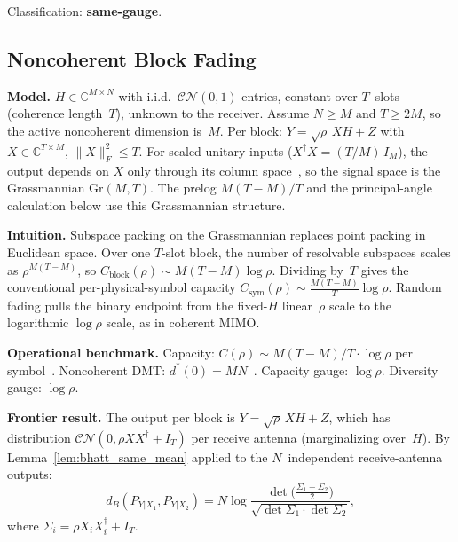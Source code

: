 \documentclass[lettersize,onecolumn]{IEEEtran}
\newcommand{\C}{\mathbb{C}}
\newcommand{\snr}{\rho}
\begin{document}
Classification: \textbf{same-gauge}.

\subsection{Noncoherent Block Fading}\label{subsec:ch_block}

\textbf{Model.}
$H \in \C^{M\times N}$ with i.i.d.\
$\mathcal{CN}(0,1)$ entries, constant over $T$~slots (coherence
length~$T$), unknown to the receiver. Assume $N \ge M$ and $T \ge 2M$, so the active noncoherent dimension
is~$M$. Per block:
$Y = \sqrt{\snr}\,XH + Z$ with $X \in \C^{T\times M}$,
$\|X\|_F^2 \le T$. For scaled-unitary inputs
($X^\dagger X = (T/M)\,I_M$), the output depends on $X$ only
through its column space~\cite{ZhengTse2002}, so the signal space
is the Grassmannian $\mathrm{Gr}(M,T)$. The prelog
$M(T-M)/T$ and the principal-angle calculation below use this
Grassmannian structure.

\textbf{Intuition.}
Subspace packing on the Grassmannian replaces point packing in
Euclidean space. Over one $T$-slot block, the number of resolvable
subspaces scales as $\snr^{M(T-M)}$, so
$C_{\mathrm{block}}(\snr) \sim M(T-M)\log\snr$. Dividing by~$T$
gives the conventional per-physical-symbol capacity
$C_{\mathrm{sym}}(\snr) \sim \frac{M(T-M)}{T}\log\snr$. Random fading pulls the binary endpoint from the fixed-$H$
linear~$\snr$ scale to the logarithmic $\log\snr$ scale, as in
coherent MIMO.

\textbf{Operational benchmark.}
Capacity: $C(\snr) \sim M(T-M)/T\cdot\log\snr$ per
symbol~\cite{ZhengTse2002}. Noncoherent DMT:
$d^*(0) = MN$~\cite{ZhengTse2002Allerton}.
Capacity gauge: $\log\snr$. Diversity gauge: $\log\snr$.

\textbf{Frontier result.}
The output per block is $Y = \sqrt{\snr}\,XH + Z$, which has
distribution $\mathcal{CN}(0, \snr XX^\dagger + I_T)$ per receive
antenna (marginalizing over~$H$). By
Lemma~\ref{lem:bhatt_same_mean} applied to the $N$~independent
receive-antenna outputs:
\begin{equation}\label{eq:bhatt_block}
d_B(P_{Y|X_1},P_{Y|X_2}) = N\log
\frac{\det\!\big(\frac{\Sigma_1+\Sigma_2}{2}\big)}
{\sqrt{\det\Sigma_1\cdot\det\Sigma_2}},
\end{equation}
where $\Sigma_i = \snr X_i X_i^\dagger + I_T$.
\end{document}

